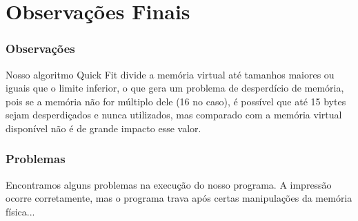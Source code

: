 \documentclass{beamer}
\begin{document}
\section{Observações Finais}



\begin{frame}
  \frametitle{Observações}
  Nosso algoritmo Quick Fit divide a memória virtual até tamanhos maiores ou iguais que o limite inferior, o que gera um problema de desperdício de memória, pois se a memória não for múltiplo dele (16 no caso),
  é possível que até 15 bytes sejam desperdiçados e nunca utilizados, mas comparado com a memória virtual disponível não é de grande impacto esse valor.
\end{frame}


\begin{frame}
  \frametitle{Problemas}
  Encontramos alguns problemas na execução do nosso programa. A impressão ocorre corretamente, mas o programa trava após certas manipulações da memória física...


\end{frame}
\end{document}
